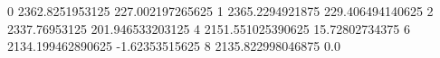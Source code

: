 0 2362.8251953125 227.002197265625
1 2365.2294921875 229.406494140625
2 2337.76953125 201.946533203125
4 2151.551025390625 15.72802734375
6 2134.199462890625 -1.62353515625
8 2135.822998046875 0.0
